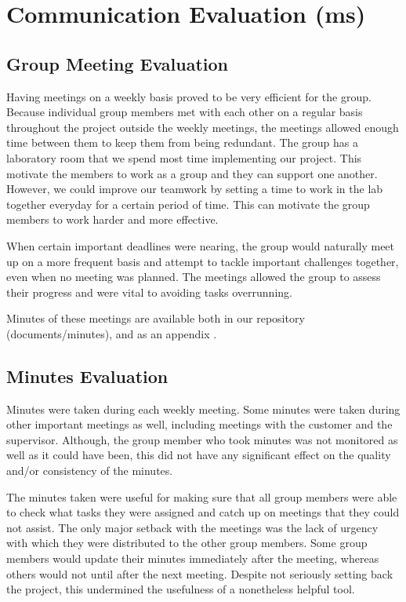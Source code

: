 \section{Communication Evaluation (ms)}
\label{evaluation communication}

\subsection{Group Meeting Evaluation}

Having meetings on a weekly basis proved to be very efficient
for the group. Because individual group members met with 
each other on a regular basis throughout the project outside
the weekly meetings, the meetings allowed enough time 
between them to keep them from being redundant.
The group has a laboratory room that we spend most time implementing our project.
This motivate the members to work as a group and they can support one another.
However, we could improve our teamwork by setting a time to work 
in the lab together everyday for a certain period of time. 
This can motivate the group members to work harder and more effective.

When certain important deadlines were nearing, the group
would naturally meet up on a more frequent basis and
attempt to tackle important challenges together, even when
no meeting was planned. The meetings allowed the group 
to assess their progress and were vital to avoiding tasks
overrunning.

Minutes of these meetings are available both in our repository \cite{github} 
(documents/minutes), and as an appendix \cite{chap:meeting_minutes}.

\subsection{Minutes Evaluation}

Minutes were taken during each weekly meeting. 
Some minutes were taken during other important meetings 
as well, including meetings with the customer and the 
supervisor. Although, the group member who took 
minutes was not monitored as well as it could have been, 
this did not have any significant effect on the quality 
and/or consistency of the minutes.

The minutes taken were useful for making sure that
all group members were able to check what tasks
they were assigned and catch up on meetings that they
could not assist. The only major setback with the meetings
was the lack of urgency with which they were distributed
to the other group members. Some group members would
update their minutes immediately after the meeting, whereas 
others would not until after the next meeting. Despite
not seriously setting back the project, this undermined the
usefulness of a nonetheless helpful tool.


